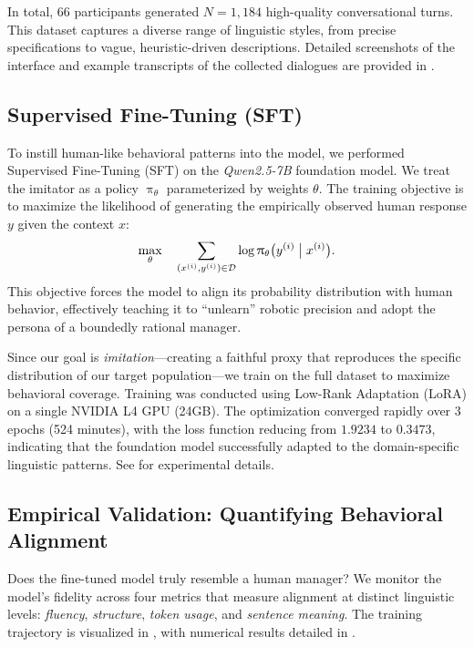 \documentclass[mnsc,nonblindrev]{informs3_hide}
\newcommand{\policy}{\ensuremath{\uppi}}
\newcommand{\paratheta}{\ensuremath{\theta}}
\newcommand{\policytheta}{\ensuremath{\policy_{\paratheta}}}
\newcommand{\prompt}{\ensuremath{x}}
\newcommand{\response}{\ensuremath{y}}
\newcommand{\Data}{\ensuremath{\mathcal{D}}}
\begin{document}
In total, $66$ participants generated $N = 1,184$ high-quality conversational turns. This dataset captures a diverse range of linguistic styles, from precise specifications to vague, heuristic-driven descriptions. Detailed screenshots of the interface and example transcripts of the collected dialogues are provided in .

\subsection{Supervised Fine-Tuning (SFT)}

To instill human-like behavioral patterns into the model, we performed Supervised Fine-Tuning (SFT) on the \emph{Qwen2.5-7B} foundation model. We treat the imitator as a policy $\policytheta$ parameterized by weights $\paratheta$. The training objective is to maximize the likelihood of generating the empirically observed human response $\response$ given the context $\prompt$:
\[
\max_\theta \quad \sum_{(\prompt^{(i)}, \response^{(i)}) \in \Data} \log \policytheta \big(\response^{(i)} \bigm| \prompt^{(i)} \big).
\]
This objective forces the model to align its probability distribution with human behavior, effectively teaching it to ``unlearn'' robotic precision and adopt the persona of a boundedly rational manager.

Since our goal is \emph{imitation}—creating a faithful proxy that reproduces the specific distribution of our target population—we train on the full dataset to maximize behavioral coverage. Training was conducted using Low-Rank Adaptation (LoRA) on a single NVIDIA L4 GPU (24GB). The optimization converged rapidly over 3 epochs (524 minutes), with the loss function reducing from $1.9234$ to $0.3473$, indicating that the foundation model successfully adapted to the domain-specific linguistic patterns. See  for experimental details. 

\subsection{Empirical Validation: Quantifying Behavioral Alignment}

Does the fine-tuned model truly resemble a human manager? We monitor the model's fidelity across four metrics that measure alignment at distinct linguistic levels: \emph{fluency}, \emph{structure}, \emph{token usage}, and \emph{sentence meaning}. The training trajectory is visualized in , with numerical results detailed in .
\end{document}
